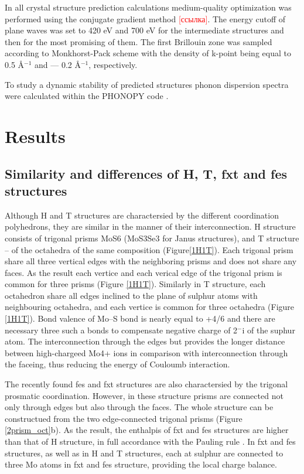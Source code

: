 \documentclass[a4paperm]{article}
\begin{document}
In all crystal structure prediction calculations medium-quality optimization was performed using the conjugate gradient method \textcolor{red}{[ссылка]}. The energy cutoff of plane waves was set to 420 eV and 700 eV for the intermediate structures and then for the most promising of them. The first Brillouin zone was sampled according to Monkhorst-Pack scheme \cite{monkhorst1976special} with the density of k-point being equal to 0.5 \AA$^{-1}$ and --- 0.2 \AA$^{-1}$, respectively. 


To study a dynamic stability of predicted structures phonon dispersion spectra were calculated within the PHONOPY code \cite{phonopy}.


			\section{Results}

\subsection{Similarity and differences of H, T, fxt and fes structures}

Although H and T structures are charactersied by the different coordination polyhedrons, they are similar in the manner of their interconnection.
H structure consists of trigonal prisms MoS6 (MoS3Se3 for Janus structures), and T structure – of the octahedra of the same composition (Figure\ref{1H1T}).
Each trigonal prism share all three vertical edges with the neighboring prisms and does not share any faces.
As the result each vertice and each verical edge of the trigonal prism is common for three prisms (Figure \ref{1H1T}).
Similarly in T structure, each octahedron share all edges inclined to the plane of sulphur atoms with neighbouring octahedra, and each vertice is common for three octahedra (Figure \ref{1H1T}).
Bond valence of Mo--S bond is nearly equal to +4/6 and there are necessary three such a bonds to compensate negative charge of 2$^-$i of the suphur atom.
The interconnection through the edges but provides the longer distance between high-chargeed Mo4+ ions in comparison with interconnection through the faceing, thus reducing the energy of Couloumb interaction.

The recently found fes and fxt structures are also charactersied by the trigonal prosmatic coordination.
However, in these structure prisms are connected not only through edges but also through the faces.
The whole structure can be constructued from the two edge-connected trigonal prisms (Figure \ref{2prism_oct}b).
As the result, the enthalpis of fxt and fes structures are higher than that of H structure, in full accordance with the Pauling rule \cite{Pauling1929}.
In fxt and fes structures, as well as in H and T structures, each at sulphur are connected to three Mo atoms in fxt and fes structure, providing the local charge balance.
\end{document}
